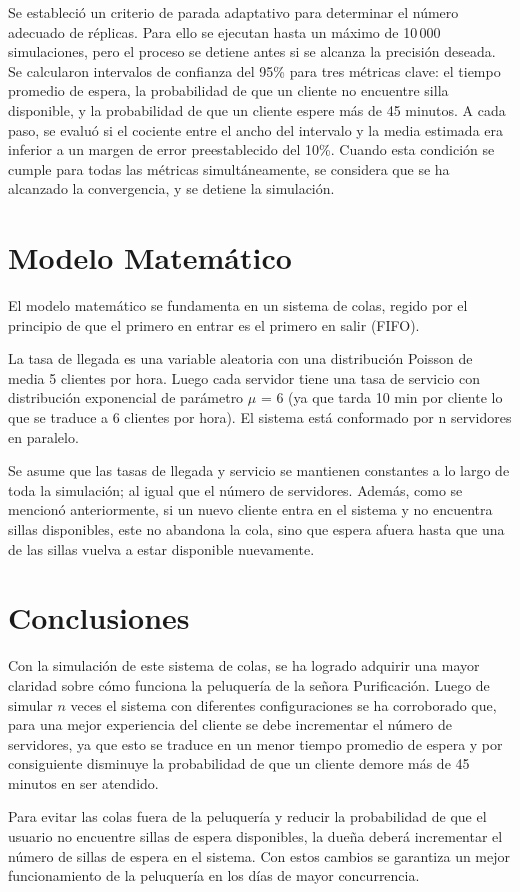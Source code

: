 \documentclass{article}
\begin{document}
Se estableció un criterio de parada adaptativo para determinar el número adecuado de réplicas. Para ello se ejecutan hasta un máximo de 10\,000 simulaciones, pero el proceso se detiene antes si se alcanza la precisión deseada.
Se calcularon intervalos de confianza del 95\% para tres métricas clave: el tiempo promedio de espera, la probabilidad de que un cliente no encuentre silla disponible, y la probabilidad de que un cliente espere más de 45 minutos. A cada paso, se evaluó si el cociente entre el ancho del intervalo y la media estimada era inferior a un margen de error preestablecido del 10\%. Cuando esta condición se cumple para todas las métricas simultáneamente, se considera que se ha alcanzado la convergencia, y se detiene la simulación.

\section{Modelo Matemático}
El modelo matemático se fundamenta en un sistema de colas, regido por el principio de que el primero en entrar es el primero en salir (FIFO).

La tasa de llegada es una variable aleatoria con una distribución Poisson de media 5 clientes por hora. Luego cada servidor tiene una tasa de servicio con distribución exponencial de parámetro $\mu$ = 6 (ya que tarda 10 min por cliente lo que se traduce a 6 clientes por hora). El sistema está conformado por n servidores en paralelo.

Se asume que las tasas de llegada y servicio se mantienen constantes a lo largo de toda la simulación; al igual que el número de servidores. Además, como se mencionó anteriormente, si un nuevo cliente entra en el sistema y no encuentra sillas disponibles, este no abandona la cola, sino que espera afuera hasta que una de las sillas vuelva a estar disponible nuevamente.

\section{Conclusiones}
Con la simulación de este sistema de colas, se ha logrado adquirir una mayor claridad sobre cómo funciona la peluquería de la señora Purificación. Luego de simular $n$ veces el sistema con diferentes configuraciones se ha corroborado que, para una mejor experiencia del cliente se debe incrementar el número de servidores, ya que esto se traduce en un menor tiempo promedio de espera y por consiguiente disminuye la probabilidad de que un cliente demore más de 45 minutos en ser atendido.

Para evitar las colas fuera de la peluquería y reducir la probabilidad de que el usuario no encuentre sillas de espera disponibles, la dueña deberá incrementar el número de sillas de espera en el sistema.
Con estos cambios se garantiza un mejor funcionamiento de la peluquería en los días de mayor concurrencia.
\end{document}
